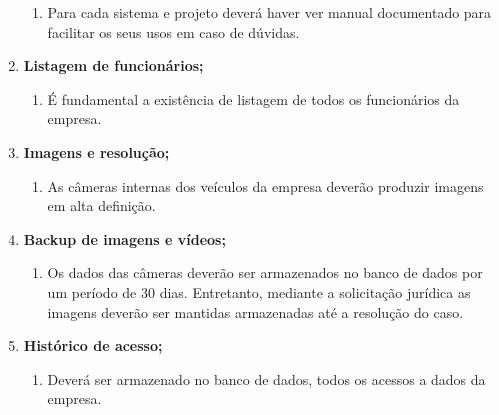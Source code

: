 \begin{enumerate}
\begin{enumerate}
                  \item	Para cada sistema e projeto deverá haver ver manual documentado para facilitar os seus usos em caso de dúvidas.



            \end{enumerate}

      \item \textbf{Listagem de funcionários;}
            \begin{enumerate}

                  \item	É fundamental a existência de listagem de todos os funcionários da empresa.



            \end{enumerate}

      \item \textbf{Imagens e resolução;}
            \begin{enumerate}

                  \item	As câmeras internas dos veículos da empresa deverão produzir imagens em alta definição.



            \end{enumerate}

      \item \textbf{Backup de imagens e vídeos; }
            \begin{enumerate}

                  \item	Os dados das câmeras deverão ser armazenados no banco de dados por um período de 30 dias. Entretanto, mediante a solicitação jurídica as imagens deverão ser mantidas armazenadas até a resolução do caso.


            \end{enumerate}

      \item \textbf{Histórico de acesso;}
            \begin{enumerate}

                  \item	Deverá ser armazenado no banco de dados, todos os acessos a dados da empresa.




\end{enumerate}
\end{enumerate}
